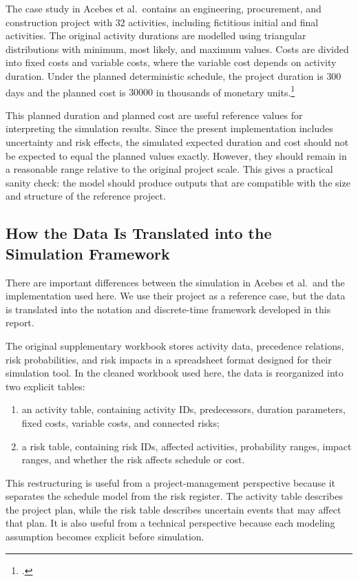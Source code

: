 \documentclass[11pt,a4paper]{article}
\newcommand{\1}{\mathbf{1}}
\theoremstyle{definition}
\theoremstyle{plain}
\theoremstyle{remark}
\numberwithin{equation}{section}
\begin{document}
The case study in Acebes et al.\ contains an engineering, procurement, and construction project with $32$ activities, including fictitious initial and final activities. The original activity durations are modelled using triangular distributions with minimum, most likely, and maximum values. Costs are divided into fixed costs and variable costs, where the variable cost depends on activity duration. Under the planned deterministic schedule, the project duration is $300$ days and the planned cost is $30000$ in thousands of monetary units.\footcite{acebes2024beyondProbabilityImpactMatrices}

This planned duration and planned cost are useful reference values for interpreting the simulation results. Since the present implementation includes uncertainty and risk effects, the simulated expected duration and cost should not be expected to equal the planned values exactly. However, they should remain in a reasonable range relative to the original project scale. This gives a practical sanity check: the model should produce outputs that are compatible with the size and structure of the reference project.

\subsection{How the Data Is Translated into the Simulation Framework}

There are important differences between the simulation in Acebes et al.\ and the implementation used here. We use their project as a reference case, but the data is translated into the notation and discrete-time framework developed in this report.

The original supplementary workbook stores activity data, precedence relations, risk probabilities, and risk impacts in a spreadsheet format designed for their simulation tool. In the cleaned workbook used here, the data is reorganized into two explicit tables:

\begin{enumerate}
    \item an activity table, containing activity IDs, predecessors, duration parameters, fixed costs, variable costs, and connected risks;
    \item a risk table, containing risk IDs, affected activities, probability ranges, impact ranges, and whether the risk affects schedule or cost.
\end{enumerate}

This restructuring is useful from a project-management perspective because it separates the schedule model from the risk register. The activity table describes the project plan, while the risk table describes uncertain events that may affect that plan. It is also useful from a technical perspective because each modeling assumption becomes explicit before simulation.
\end{document}
